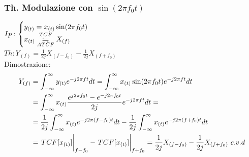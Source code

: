         \subsubsection{Th. Modulazione con $\sin(2\pi f_0t)$}\label{Modulazione con seno}
        $Ip:\begin{cases}
                y_{(t)}= x_{(t)}\sin(2\pi f_0t)\\        
                x_{(t)}\overunderset{TCF}{ATCF}{\leftrightharpoons} X_{(f)}
            \end{cases}$\\
        $Th: Y_{(f)} = \frac{1}{2j} X_{(f-f_0)} - \frac{1}{2j} X_{(f+f_0)} $ \\
        Dimostrazione: 
        \begin{align}
            Y_{(f)} & = \int_{-\infty}^{\infty} y_{(t)} e^{-j2\pi ft} dt = \int_{-\infty}^{\infty} x_{(t)}\sin(2\pi f_0t) e^{-j2\pi ft} dt \nonumber \\
            & =\int_{-\infty}^{\infty} x_{(t)} \frac{e^{j2\pi f_0t} - e^{-j2\pi f_0t}}{2j} e^{-j2\pi ft} dt =  \nonumber \\
            & = \frac{1}{2j} \int_{-\infty}^{\infty} x_{(t)} e^{-j2\pi (f-f_0)t} dt - \frac{1}{2j} \int_{-\infty}^{\infty} x_{(t)} e^{-j2\pi (f+f_0)t} dt \nonumber \\
            & = \eval{TCF[x_{(t)}]}_{f-f_0} - \eval{TCF[x_{(t)}]}_{f+f_0} = \frac{1}{2j} X_{(f-f_0)} - \frac{1}{2j} X_{(f+f_0)}\ c.v.d \nonumber  
        \end{align}

